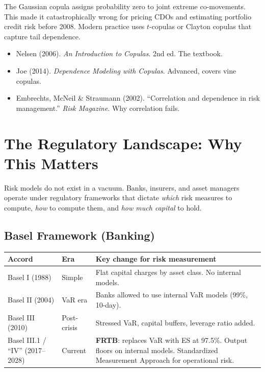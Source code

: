 \documentclass[11pt, a4paper]{article}
\theoremstyle{definition}
\theoremstyle{plain}
\theoremstyle{remark}
\begin{document}
\begin{keyresult}
The Gaussian copula assigns probability zero to joint extreme co-movements.
This made it catastrophically wrong for pricing CDOs and estimating portfolio credit risk before 2008.
Modern practice uses $t$-copulas or Clayton copulas that capture tail dependence.
\end{keyresult}

\begin{refbox}
\begin{itemize}
    \item Nelsen (2006). \emph{An Introduction to Copulas}. 2nd ed. The textbook.
    \item Joe (2014). \emph{Dependence Modeling with Copulas}. Advanced, covers vine copulas.
    \item Embrechts, McNeil \& Straumann (2002). ``Correlation and dependence in risk management.'' \emph{Risk Magazine}. Why correlation fails.
\end{itemize}
\end{refbox}

\section{The Regulatory Landscape: Why This Matters}

Risk models do not exist in a vacuum.
Banks, insurers, and asset managers operate under regulatory frameworks that dictate \emph{which} risk measures to compute, \emph{how} to compute them, and \emph{how much capital} to hold.

\subsection{Basel Framework (Banking)}

\begin{table}[H]
\centering
\begin{tabular}{@{}llp{7.5cm}@{}}
\toprule
\textbf{Accord} & \textbf{Era} & \textbf{Key change for risk measurement} \\
\midrule
Basel I (1988)   & Simple & Flat capital charges by asset class. No internal models. \\
Basel II (2004)  & VaR era & Banks allowed to use internal VaR models (99\%, 10-day). \\
Basel III (2010) & Post-crisis & Stressed VaR, capital buffers, leverage ratio added. \\
Basel III.1 / ``IV'' (2017--2028) & Current & \textbf{FRTB}: replaces VaR with ES at 97.5\%. Output floors on internal models. Standardized Measurement Approach for operational risk. \\
\bottomrule
\end{tabular}
\end{table}
\end{document}

